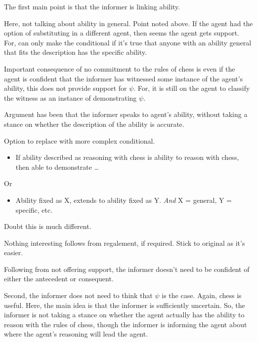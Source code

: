 \documentclass[10pt]{article}
\begin{document}
\begin{note}
  The first main point is that the informer is linking ability.
\end{note}

\begin{note}
  Here, not talking about ability in general.
  Point noted above.
  If the agent had the option of substituting in a different agent, then seems the agent gets support.
  For, can only make the conditional if it's true that anyone with an ability general that fits the description has the specific ability.
\end{note}

\begin{note}
  Important consequence of no commitment to the rules of chess is even if the agent is confident that the informer has witnessed some instance of the agent's ability, this does not provide support for \(\psi\).
  For, it is still on the agent to classify the witness as an instance of demonstrating \(\psi\).
\end{note}

\begin{note}
  Argument has been that the informer speaks to agent's ability, without taking a stance on whether the description of the ability is accurate.

   Option to replace with more complex conditional.

  \begin{itemize}
  \item If ability described as reasoning with chess is ability to reason with chess, then able to demonstrate \dots
  \end{itemize}
  Or
  \begin{itemize}
  \item Ability fixed as X, extends to ability fixed as Y. \emph{And} X = general, Y = specific, etc.
  \end{itemize}
  Doubt this is much different.

  Nothing interesting follows from regalement, if required.
  Stick to original as it's easier.
\end{note}

\begin{note}
  Following from not offering support, the informer doesn't need to be confident of either the antecedent or consequent.

  Second, the informer does not need to think that \(\psi\) is the case.
  Again, chess is useful.
  Here, the main idea is that the informer is sufficiently uncertain.
  So, the informer is not taking a stance on whether the agent actually has the ability to reason with the rules of chess, though the informer is informing the agent about where the agent's reasoning will lead the agent.
\end{note}
\end{document}
